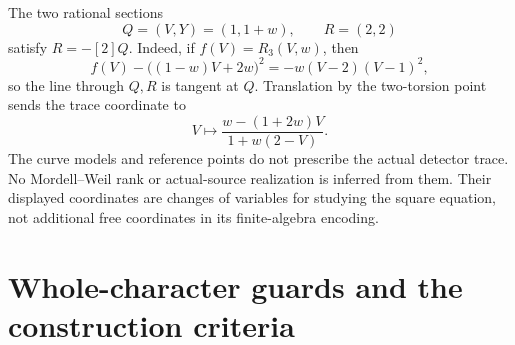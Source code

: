 \documentclass[11pt,a4paper]{article}
\begin{document}
The two rational sections
\[
 Q=(V,Y)=(1,1+w),\qquad R=(2,2)
\]
satisfy $R=-[2]Q$. Indeed, if $f(V)=R_3(V,w)$, then
\[
 f(V)-\bigl((1-w)V+2w\bigr)^2=-w(V-2)(V-1)^2,
\]
so the line through $Q,R$ is tangent at $Q$. Translation by the
two-torsion point sends the trace coordinate to
\[
                V\longmapsto
                \frac{w-(1+2w)V}{1+w(2-V)}.
\]
The curve models and reference points do not prescribe the actual
detector trace. No Mordell--Weil rank or actual-source realization
is inferred from them. Their displayed coordinates are changes of
variables for studying the square equation, not additional free
coordinates in its finite-algebra encoding.

\section{Whole-character guards and the construction criteria}
\end{document}
